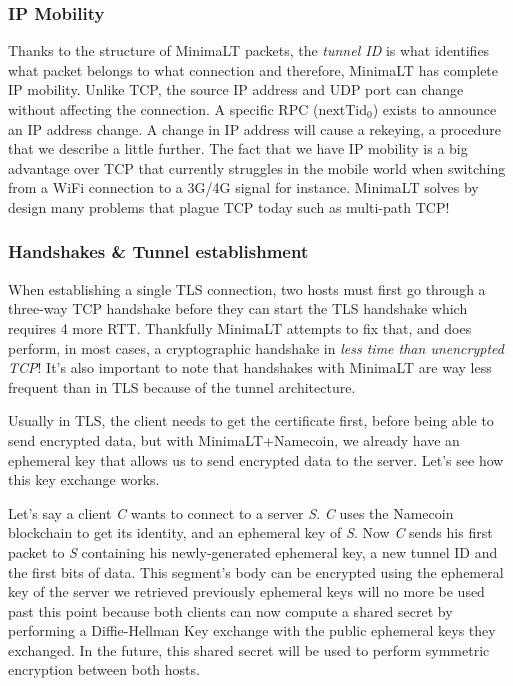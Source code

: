 \documentclass{vldb}
\begin{document}
\subsubsection{IP Mobility}

Thanks to the structure of MinimaLT packets, the \emph{tunnel ID} is what identifies what packet belongs to what connection and therefore, MinimaLT has complete IP mobility. Unlike TCP, the source IP address and UDP port can change without affecting the connection. A specific RPC (\emph{$\text{nextTid}_{0}$}) exists to announce an IP address change. A change in IP address will cause a rekeying, a procedure that we describe a little further. The fact that we have IP mobility is a big advantage over TCP that currently struggles in the mobile world when switching from a WiFi connection to a 3G/4G signal for instance. MinimaLT solves by design many problems that plague TCP today such as multi-path TCP!

\subsubsection{Handshakes \& Tunnel establishment}

When establishing a single TLS connection, two hosts must first go through a three-way TCP  handshake before they can start the TLS handshake which requires 4 more RTT. Thankfully MinimaLT attempts to fix that, and does perform, in most cases, a cryptographic handshake in \emph{less time than unencrypted TCP}! It's also important to note that handshakes with MinimaLT are way less frequent than in TLS because of the tunnel architecture.

Usually in TLS, the client needs to get the certificate first, before being able to send encrypted data, but with MinimaLT+Namecoin, we already have an ephemeral key that allows us to send encrypted data to the server. Let's see how this key exchange works.

Let's say a client \emph{C} wants to connect to a server \emph{S}. \emph{C} uses the Namecoin blockchain to get its identity, and an ephemeral key of \emph{S}. Now \emph{C} sends his first packet to \emph{S} containing his newly-generated ephemeral key, a new tunnel ID and the first bits of data. This segment's body can be encrypted using the ephemeral key of the server we retrieved previously ephemeral keys will no more be used past this point because both clients can now compute a shared secret by performing a Diffie-Hellman Key exchange with the public ephemeral keys they exchanged. In the future, this shared secret will be used to perform symmetric encryption between both hosts.
\end{document}
